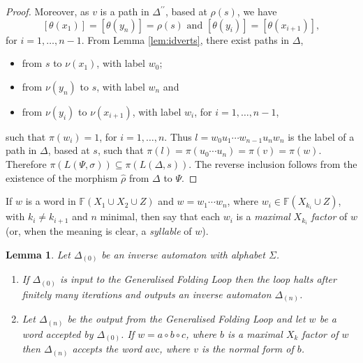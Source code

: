 \documentclass[a4paper,12pt]{article}
\renewcommand{\a}{\alpha }
\renewcommand{\b}{\beta }
\newcommand{\g}{\gamma }
\newcommand{\D}{\Delta }
\newcommand{\T}{\Theta }
\renewcommand{\L}{\Lambda }
\newcommand{\s}{\sigma }
\renewcommand{\S}{\Sigma }
\newtheorem{lemma}[theorem]{Lemma}
\numberwithin{equation}{section}
\numberwithin{figure}{section}
\newcommand{\FF}{\ensuremath{\mathbb{F}}}
\newcommand{\be}{\begin{enumerate}}
\newcommand{\ee}{\end{enumerate}}
\begin{document}
\begin{proof}
 Moreover, as $v$ is a path in $\D^{\prime\prime}$, based at $\rho(s)$,
we have
\[[\theta(x_1)]=[\theta(y_n)]=\rho(s)\textrm{ and }[\theta(y_i)]=[\theta(x_{i+1})],\]
for $i=1,\ldots ,n-1$. From Lemma \ref{lem:idverts}, there exist paths in
$\D$,
\begin{itemize}
\item
from $s$ to $\nu(x_1)$, with label $w_0$;
\item  from $\nu(y_n)$ to $s$, with label $w_n$ and
\item from $\nu(y_i)$ to $\nu(x_{i+1})$, with label $w_i$, for $i=1,\ldots,
n-1$,
\end{itemize}
such that $\pi(w_i)=1$, for $i=1,\ldots ,n$. Thus $l=w_0u_1\cdots w_{n-1}u_n
w_n$ is the label of a path in $\D$, based at $s$, such that
$\pi(l)=\pi(u_0\cdots u_n)=\pi(v)=\pi(w)$.
 Therefore
$\pi(L(\Psi,\s))\subseteq \pi(L(\D,s))$. The reverse inclusion follows
from the existence of the morphism $\hat\rho$ from $\D$ to $\Psi$.

\end{proof}
If $w$ is a word in $\FF(X_1\cup X_2\cup Z)$ and $w=w_1\cdots w_n$,
where $w_i\in \FF(X_{k_i}\cup Z)$, with $k_i\neq k_{i+1}$ and $n$
minimal, then  say that each $w_i$ is a \emph{maximal} $X_{k_i}$
\emph{factor}
of $w$ (or, when the meaning is clear, a \emph{syllable} of $w$).
\begin{lemma}\label{lem:loopstop}
Let $\D_{(0)}$ be an inverse automaton with alphabet $\S$.
\be
\item\label{it:loopstop1}
If $\D_{(0)}$ is input  to  the Generalised Folding Loop then the loop halts after
finitely many iterations and outputs an inverse automaton  $\D_{(n)}$.
\item\label{it:loopstop2} Let $\D_{(n)}$ be the output from the Generalised 
Folding Loop and let $w$ be a word
accepted by $\D_{(0)}$. If $w=a\circ b \circ c$,
where $b$ is a maximal $X_k$ factor of $w$ then $\D_{(n)}$ accepts
the word $avc$, where $v$ is the normal form of $b$.
\ee
\end{lemma}
\end{document}
